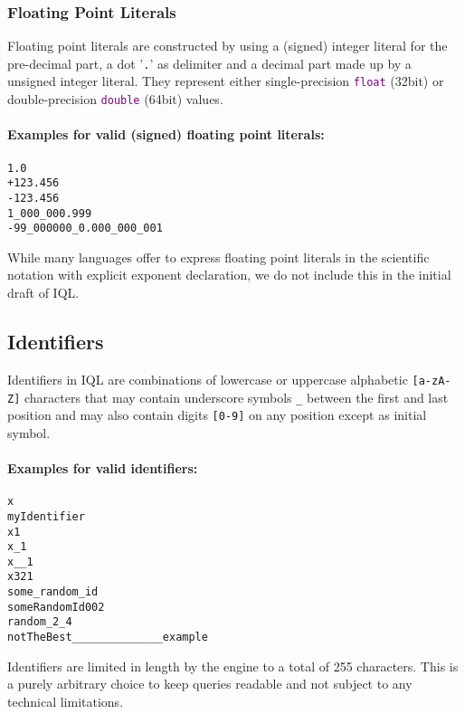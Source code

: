 \documentclass[11pt]{article}
\newcommand{\iql}{IQL\xspace}
\newcommand{\keyword}[1]{\textcolor{purple}{\texttt{#1}}}
\begin{document}
\subsubsection{Floating Point Literals}
\label{sec:floating-point-literals}

Floating point literals are constructed by using a (signed) integer literal for the pre-decimal part, a dot '\texttt{.}' as delimiter and a decimal part made up by a unsigned integer literal. They represent either single-precision \keyword{float} (32bit) or double-precision \keyword{double} (64bit) values.

\paragraph{Examples for valid (signed) floating point literals:}

\begin{verbatim}
1.0
+123.456
-123.456
1_000_000.999
-99_000000_0.000_000_001
\end{verbatim}

\noindent While many languages offer to express floating point literals in the scientific notation with explicit exponent declaration, we do not include this in the initial draft of \iql.

\subsection{Identifiers}
\label{sec:identifiers}

\noindent Identifiers in \iql are combinations of lowercase or uppercase alphabetic \texttt{[a-zA-Z]} characters that may contain underscore symbols \texttt{\_} between the first and last position and may also contain digits \texttt{[0-9]} on any position except as initial symbol.

\paragraph{Examples for valid identifiers:}

\begin{verbatim}
x
myIdentifier
x1
x_1
x__1
x321
some_random_id
someRandomId002
random_2_4
notTheBest______________example
\end{verbatim}

\noindent Identifiers are limited in length by the engine to a total of 255 characters. This is a purely arbitrary choice to keep queries readable and not subject to any technical limitations.
\end{document}
